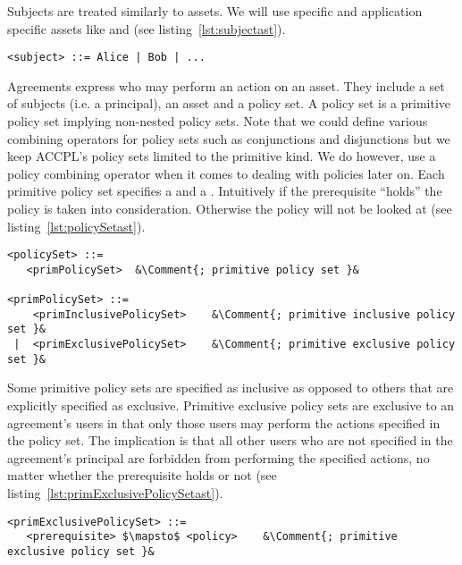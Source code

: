 Subjects are treated similarly to assets. We will use specific and application specific assets like  and  (see listing~\ref{lst:subjectast}).

\lstset{mathescape, language=AST}  
\begin{lstlisting}[frame=single, caption={subject},label={lst:subjectast}]
<subject> ::= Alice | Bob | ...
\end{lstlisting}

Agreements express who may perform an action on an asset. They include a set of subjects (i.e. a principal), an asset and a policy set. A policy set is a primitive policy set implying non-nested policy sets. Note that we could define various combining operators for policy sets such as conjunctions and disjunctions but we keep \ac{ACCPL}'s policy sets limited to the primitive kind. We do however, use a policy combining operator when it comes to dealing with policies later on. Each primitive policy set specifies a  and a . Intuitively if the prerequisite ``holds'' the policy is taken into consideration. Otherwise the policy will not be looked at (see listing~\ref{lst:policySetast}).


\newcommand*{\Comment}[1]{\hfill\makebox[7.0cm][l]{#1}}%
\lstset{mathescape, language=AST, escapechar=\&}  
\begin{minipage}[c]{0.95\textwidth}
\begin{lstlisting}[frame=single, caption={policySet and primPolicySet},label={lst:policySetast}]
<policySet> ::=  
   <primPolicySet>	&\Comment{; primitive policy set }&
   
<primPolicySet> ::=  
    <primInclusivePolicySet>	&\Comment{; primitive inclusive policy set }&
 |  <primExclusivePolicySet>	&\Comment{; primitive exclusive policy set }&
\end{lstlisting}
\end{minipage}

Some primitive policy sets are specified as inclusive as opposed to others that are explicitly specified as exclusive. Primitive exclusive policy sets are exclusive to an agreement's users in that only those users may perform the actions specified in the policy set. The implication is that all other users who are not specified in the agreement's principal are forbidden from performing the specified actions, no matter whether the prerequisite holds or not (see listing~\ref{lst:primExclusivePolicySetast}).

\lstset{mathescape, language=AST, escapechar=\&}  
\begin{lstlisting}[frame=single, caption={primExclusivePolicySet},label={lst:primExclusivePolicySetast}]
<primExclusivePolicySet> ::=  
   <prerequisite> $\mapsto$ <policy>	&\Comment{; primitive exclusive policy set }&
\end{lstlisting}

